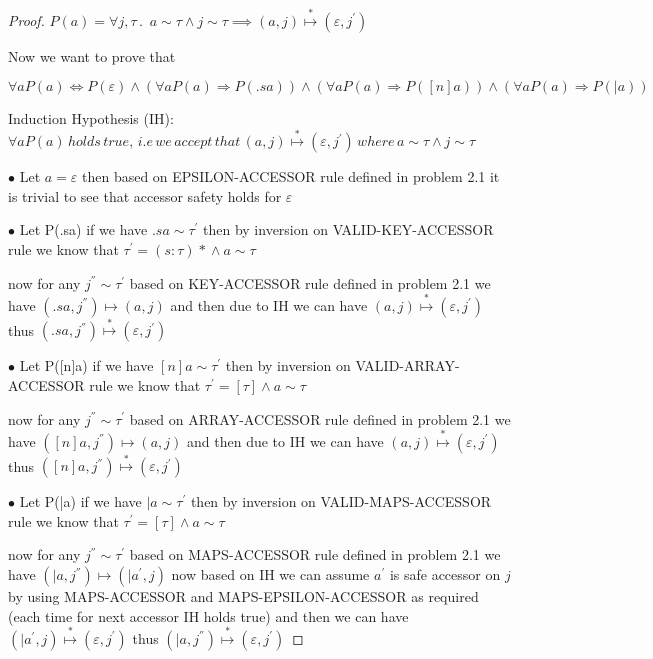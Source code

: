 \documentclass[11pt]{article}
\newcommand{\matches}[2]{{#1}\sim{#2}}   %
\newcommand{\aeps}{\varepsilon}          %
\begin{document}
\begin{proof}
$P(a) = \forall j, \tau \, . \,\,\, \matches{a}{\tau} \land \matches{j}{\tau} \implies (a, j) \overset{*}{\mapsto} (\aeps, j^{'}) $

Now we want to prove that

$\forall a P(a) \iff P(\aeps) \land (\forall a P(a) \Rightarrow P(.sa)) \land (\forall a P(a) \Rightarrow P([n]a)) \land (\forall a P(a) \Rightarrow P(|a))$

Induction Hypothesis (IH): 
$\forall a P(a) \, holds \, true,\, i.e \,we \,accept\, that\,  (a, j) \overset{*}{\mapsto} (\aeps, j^{'}) \,
where\, \matches{a}{\tau} \land \matches{j}{\tau} $

$\bullet$ Let $a =  \aeps$ then based on EPSILON-ACCESSOR rule defined in problem 2.1 it is trivial to see that accessor safety holds for $\aeps$

$\bullet$ Let P(.sa) if we have $\matches{.sa}{\tau^{'}}$ then by inversion on VALID-KEY-ACCESSOR rule we know that
$\tau^{'} = {(s : \tau)^{}*} \land \matches{a}{\tau}$ 

now for any $\matches{j^{''}}{\tau^{'}}$ based on KEY-ACCESSOR rule defined in problem 2.1 we have
$(.sa, j^{''}) \mapsto (a, j)$ and then due to IH we can have $(a, j) \overset{*}{\mapsto} (\aeps, j^{'})$
thus $(.sa, j^{''}) \overset{*}{\mapsto} (\aeps, j^{'}) $


$\bullet$ Let P([n]a) if we have $\matches{[n]a}{\tau^{'}}$ then by inversion on VALID-ARRAY-ACCESSOR rule we know that
$\tau^{'} = [\tau] \land \matches{a}{\tau}$ 

now for any $\matches{j^{''}}{\tau^{'}}$ based on ARRAY-ACCESSOR rule defined in problem 2.1 we have
$([n]a, j^{''}) \mapsto (a, j)$ and then due to IH we can have $(a, j) \overset{*}{\mapsto} (\aeps, j^{'})$
thus $([n]a, j^{''}) \overset{*}{\mapsto} (\aeps, j^{'}) $

$\bullet$ Let P(|a) if we have $\matches{|a}{\tau^{'}}$ then by inversion on VALID-MAPS-ACCESSOR rule we know that
$\tau^{'} = [\tau] \land \matches{a}{\tau}$ 

now for any $\matches{j^{''}}{\tau^{'}}$ based on MAPS-ACCESSOR rule defined in problem 2.1 we have
$(|a, j^{''}) \mapsto (|a^{'}, j)$ now based on IH we can assume $a^{'}$ is safe accessor on $j$ by using MAPS-ACCESSOR and MAPS-EPSILON-ACCESSOR as required (each time for next accessor IH holds true) and then  we can have $(|a^{'}, j) \overset{*}{\mapsto} (\aeps, j^{'})$
thus $(|a, j^{''}) \overset{*}{\mapsto} (\aeps, j^{'}) $


\end{proof}
\end{document}
